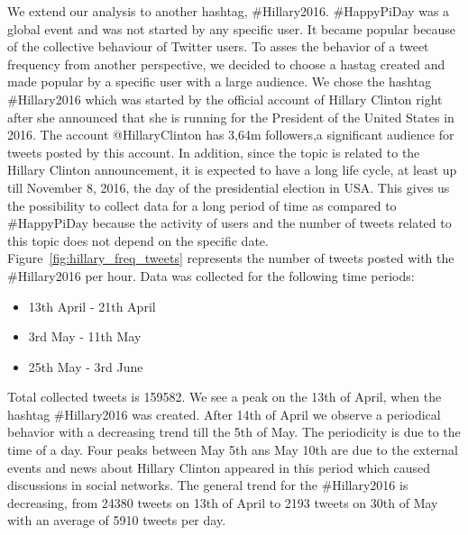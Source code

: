 \documentclass[journal, a4paper, 12pt]{article}
\begin{document}
    
We extend our analysis to another hashtag, \#Hillary2016. \#HappyPiDay was a global event and was not started by any specific user. It became popular because of the collective behaviour of Twitter users. To asses the behavior of a tweet frequency from another perspective, we decided to choose a hastag created and made popular by a specific user with a large audience. We chose the hashtag \#Hillary2016 which was started by the official account of Hillary Clinton right after she announced that she is running for the President of the United States in 2016. The account @HillaryClinton has 3,64m followers,a significant audience for tweets posted by this account. In addition, since the topic is related to the Hillary Clinton announcement, it is expected to have a long life cycle, at least up till November 8, 2016, the day of the presidential election in USA. This gives us the possibility to collect data for a long period of time as compared to \#HappyPiDay because the activity of users and the number of tweets related to this topic does not depend on the specific date.
\\

Figure~\ref{fig:hillary_freq_tweets} represents the number of tweets posted with the \#Hillary2016 per hour. Data was collected for the following time periods:
\begin{itemize}
\item 13th April - 21th April
\item 3rd May - 11th May
\item 25th May - 3rd June
\end{itemize}

Total collected tweets is 159582. We see a peak on the 13th of April, when the hashtag \#Hillary2016 was created. After 14th of April we observe a periodical behavior with a decreasing trend till the 5th of May. The periodicity is due to the time of a day. Four peaks between May 5th ans May 10th are due to the external events and news about Hillary Clinton appeared in this period which caused discussions in social networks. The general trend for the \#Hillary2016 is decreasing, from 24380 tweets on 13th of April to 2193 tweets on 30th of May with an average of 5910 tweets per day. \\
\end{document}
